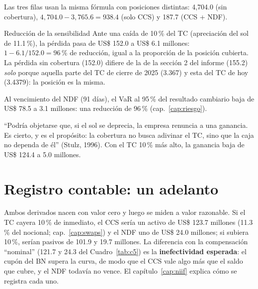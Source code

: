 Las tres filas usan la misma fórmula con posiciones distintas: 4,704.0 (sin cobertura), $4{,}704.0-3{,}765.6=938.4$ (solo CCS) y 187.7 (CCS + NDF).


\begin{ejemplo}{Reducción de la sensibilidad}
Ante una caída de 10\,\% del TC (apreciación del sol de 11.1\,\%), la pérdida pasa de US\$ 152.0 a US\$ 6.1 millones: $1-6.1/152.0=96\,\%$ de reducción, igual a la proporción de la posición cubierta. La pérdida sin cobertura (152.0) difiere de la de la sección 2 del informe (155.2) \emph{solo} porque aquella parte del TC de cierre de 2025 (3.367) y esta del TC de hoy (3.4379): la posición es la misma.
\end{ejemplo}

\begin{informe}
Al vencimiento del NDF (91 días), el VaR al 95\,\% del resultado cambiario baja de US\$ 78.5 a 3.1 millones: una reducción de 96\,\% (cap.~\ref{cap:riesgo}).
\end{informe}

\begin{informe}
\enquote{Podría objetarse que, si el sol se deprecia, la empresa renuncia a una ganancia. Es cierto, y es el propósito: la cobertura no busca adivinar el TC, sino que la caja no dependa de él} (Stulz, 1996). Con el TC 10\,\% más alto, la ganancia baja de US\$ 124.4 a 5.0 millones.
\end{informe}

\section{Registro contable: un adelanto}

Ambos derivados nacen con valor cero y luego se miden a valor razonable. Si el TC cayera 10\,\% de inmediato, el CCS sería un activo de US\$ 123.7 millones (11.3\,\% del nocional; cap.~\ref{cap:swaps}) y el NDF uno de US\$ 24.0 millones; si subiera 10\,\%, serían pasivos de 101.9 y 19.7 millones. La diferencia con la compensación \enquote{nominal} (121.7 y 24.3 del Cuadro~\ref{tab:c5}) es la \textbf{inefectividad esperada}: el cupón del BN supera la curva, de modo que el CCS vale algo más que el saldo que cubre, y el NDF todavía no vence. El capítulo~\ref{cap:niif} explica cómo se registra cada uno.

